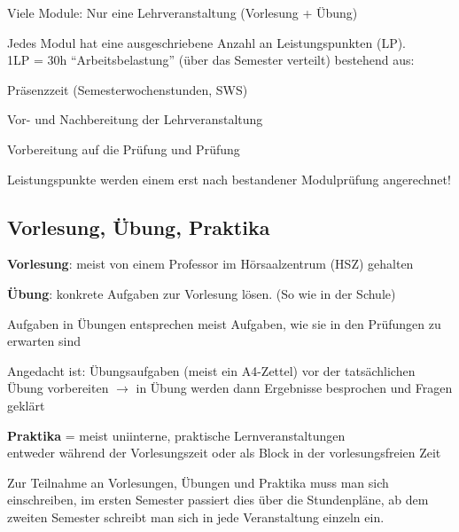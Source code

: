 \documentclass[a4paper,12pt]{report}
\begin{document}
\begin{itemize*}
    \item Viele Module: Nur eine Lehrveranstaltung (Vorlesung + Übung)
    \item Jedes Modul hat eine ausgeschriebene Anzahl an Leistungspunkten (LP).\\
        1LP = 30h \enquote{Arbeitsbelastung} (über das Semester verteilt) bestehend aus:
    \begin{itemize*}
        \item Präsenzzeit (Semesterwochenstunden, SWS)
        \item Vor- und Nachbereitung der Lehrveranstaltung
        \item Vorbereitung auf die Prüfung und Prüfung
    \end{itemize*}
    Leistungspunkte werden einem erst nach bestandener Modulprüfung angerechnet!
\end{itemize*}

\subsection{Vorlesung, Übung, Praktika}
\begin{itemize*}
    \item \textbf{Vorlesung}: meist von einem Professor im Hörsaalzentrum (HSZ) gehalten
    \item \textbf{Übung}: konkrete Aufgaben zur Vorlesung lösen. (So wie in der Schule)
    \item Aufgaben in Übungen entsprechen meist Aufgaben, wie sie in den Prüfungen zu erwarten sind
    \item Angedacht ist: Übungsaufgaben (meist ein A4-Zettel) vor der tatsächlichen Übung vorbereiten $\rightarrow$ in Übung werden dann Ergebnisse besprochen und Fragen geklärt
    \item \textbf{Praktika} = meist uniinterne, praktische Lernveranstaltungen\\
        entweder während der Vorlesungszeit oder als Block in der vorlesungsfreien Zeit
    \item Zur Teilnahme an Vorlesungen, Übungen und Praktika muss man sich einschreiben, im ersten Semester passiert dies über die Stundenpläne, ab dem zweiten Semester schreibt man sich in jede Veranstaltung einzeln ein.
\end{itemize*}
\end{document}
